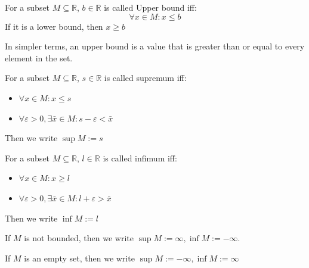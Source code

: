 \documentclass{article}
\newcommand{\R}{\mathbb{R}}
\begin{document}
\begin{definition}
	For a subset $M\subseteq \R$, $b\in \R$ is called Upper bound iff:
	\begin{equation*}
		\forall x\in M: x\leq b
	\end{equation*}
	If it is a lower bound, then $x\geq b$
\end{definition}

In simpler terms, an upper bound is a value that is greater than or equal to every element in the set.

\begin{definition}
	For a subset $M\subseteq \R$, $s\in \R$ is called supremum iff:
	\begin{itemize}
		\item $\forall x\in M: x\leq s$
		\item $\forall \varepsilon >0, \exists \bar{x}\in M : s-\varepsilon< \bar{x}$
	\end{itemize}
	Then we write $\sup M := s$
\end{definition}



\begin{definition}
		For a subset $M\subseteq \R$, $l\in \R$ is called infimum iff:
	\begin{itemize}
		\item $\forall x\in M: x\geq l$
		\item $\forall \varepsilon >0, \exists \bar{x}\in M : l+\varepsilon> \bar{x}$
	\end{itemize}
	Then we write $\inf M := l$
\end{definition}

\begin{remark}
	If $M$ is not bounded, then we write $\sup M:= \infty, \inf M:=-\infty $.
	
	If $M$ is an empty set, then we write $\sup M:= -\infty, \inf M:=\infty$
\end{remark}





\end{document}
